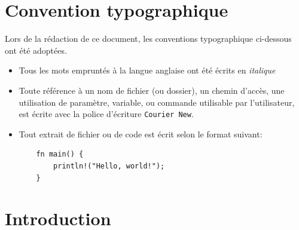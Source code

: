 \documentclass[a4paper]{article}
\begin{document}
\section*{Convention typographique}
Lors de la rédaction de ce document, les conventions typographique ci-dessous ont
été adoptées.
\begin{itemize}[label=\textbullet]
	\item Tous les mots empruntés à la langue anglaise ont été écrits en \textit{italique}
	\item Toute référence à un nom de fichier (ou dossier), un chemin d’accès, une 
    utilisation de paramètre, variable, ou commande utilisable par l’utilisateur, 
    est écrite avec la police d’écriture \texttt{Courier New}.
	\item Tout extrait de fichier ou de code est écrit selon le format suivant:
    \begin{verbatim}
    fn main() {
        println!("Hello, world!");
    }
    \end{verbatim}
\end{itemize}
\newpage

\printglossary[type=\acronymtype,title={Acronymes}]
\newpage


\section{Introduction}
\end{document}

